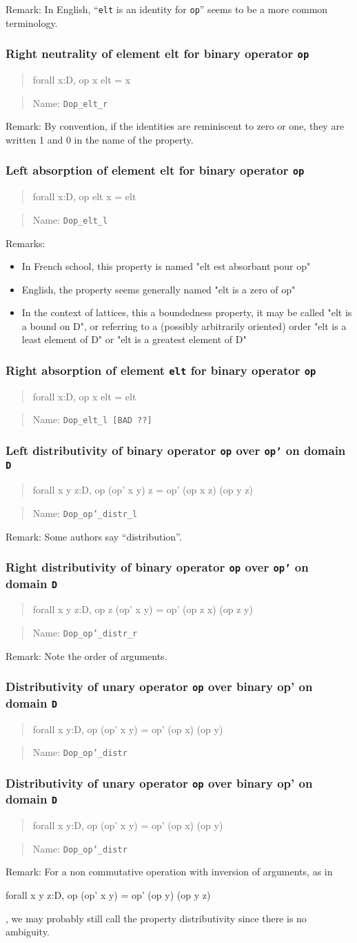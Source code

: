 \documentclass[a4paper]{article}
\newcommand\itemrule[3]{
\subsubsection{#1}
\begin{quote}
\begin{tt}
#3
\end{tt}
\end{quote}
\begin{quote}
Name: \texttt{#2}
\end{quote}}
\newcommand\formula[1]{\begin{tt}#1\end{tt}}
\newcommand\op{\texttt{op}}
\newcommand\opPrime{\texttt{op'}}
\newcommand\D{\texttt{D}}
\newcommand\elt{\texttt{elt}}
\begin{document}
  Remark: In English, ``{\elt} is an identity for {\op}'' seems to be
  a more common terminology.

\itemrule{Right neutrality of element elt for binary operator {\op}}{Dop\_elt\_r}
{forall x:D, op x elt = x}

  Remark: By convention, if the identities are reminiscent to zero or one, they
  are written 1 and 0 in the name of the property.

\itemrule{Left absorption of element elt for binary operator {\op}}{Dop\_elt\_l}
{forall x:D, op elt x = elt}

  Remarks:
  \begin{itemize}
  \item In French school, this property is named "elt est absorbant pour op"
  \item English, the property seems generally named "elt is a zero of op"
  \item In the context of lattices, this a boundedness property, it may
     be called "elt is a bound on D", or referring to a (possibly
     arbitrarily oriented) order "elt is a least element of D" or "elt
     is a greatest element of D"
  \end{itemize}

\itemrule{Right absorption of element {\elt} for binary operator {\op}}{Dop\_elt\_l  [BAD ??]}
{forall x:D, op x elt = elt}

\itemrule{Left distributivity of binary operator {\op} over {\opPrime} on domain {\D}}{Dop\_op'\_distr\_l}
{forall x y z:D, op (op' x y) z = op' (op x z) (op y z)}

  Remark: Some authors say ``distribution''.

\itemrule{Right distributivity of binary operator {\op} over {\opPrime} on domain {\D}}{Dop\_op'\_distr\_r}
{forall x y z:D, op z (op' x y) = op' (op z x) (op z y)}

  Remark: Note the order of arguments.

\itemrule{Distributivity of unary operator {\op} over binary op' on domain {\D}}{Dop\_op'\_distr}
{forall x y:D, op (op' x y) = op' (op x) (op y)}

\itemrule{Distributivity of unary operator {\op} over binary op' on domain {\D}}{Dop\_op'\_distr}
{forall x y:D, op (op' x y) = op' (op x) (op y)}

  Remark: For a non commutative operation with inversion of arguments, as in
  \formula{forall x y z:D, op (op' x y) = op' (op y) (op y z)},
  we may probably still call the property distributivity since there
  is no ambiguity.
\end{document}
